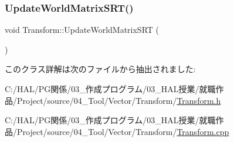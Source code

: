 \mbox{\label{class_transform_af1a2dcb4a9d37dd71c203ec248535887}} 
\subsubsection{\texorpdfstring{Update\+World\+Matrix\+S\+R\+T()}{UpdateWorldMatrixSRT()}}
{\footnotesize\ttfamily void Transform\+::\+Update\+World\+Matrix\+S\+RT (\begin{DoxyParamCaption}{ }\end{DoxyParamCaption})}



このクラス詳解は次のファイルから抽出されました\+:\begin{DoxyCompactItemize}
\item 
C\+:/\+H\+A\+L/\+P\+G関係/03\+\_\+作成プログラム/03\+\_\+\+H\+A\+L授業/就職作品/\+Project/source/04\+\_\+\+Tool/\+Vector/\+Transform/\mbox{\hyperlink{_transform_8h}{Transform.\+h}}\item 
C\+:/\+H\+A\+L/\+P\+G関係/03\+\_\+作成プログラム/03\+\_\+\+H\+A\+L授業/就職作品/\+Project/source/04\+\_\+\+Tool/\+Vector/\+Transform/\mbox{\hyperlink{_transform_8cpp}{Transform.\+cpp}}\end{DoxyCompactItemize}
